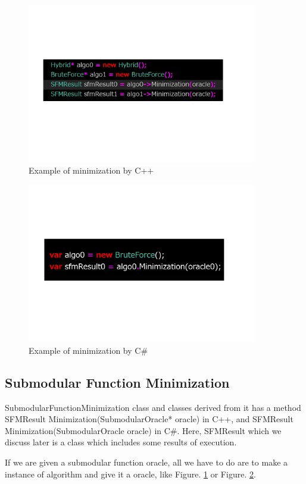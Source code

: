 \documentclass{article}
\begin{document}
\begin{figure}[h!]\label{C++MinPic}
{
\fontsize{10pt}{12pt}\selectfont
\centering
\includegraphics[height=7.0cm]{picture/C++Min.png}
\caption{Example of minimization by C++}
}
\end{figure}

\begin{figure}[h!]\label{CSMinPic}
{
\fontsize{10pt}{12pt}\selectfont
\centering
\includegraphics[height=7.0cm]{picture/CSMin.png}
\caption{Example of minimization by C\#}
}
\end{figure}

\newpage

\subsection{Submodular Function Minimization}
SubmodularFunctionMinimization class and classes derived from it has a method SFMResult Minimization(SubmodularOracle* oracle) in C++,
and SFMResult Minimization(SubmodularOracle oracle) in C\#.
Here, SFMResult which we discuss later is a class which includes some results of execution.

If we are given a submodular function oracle,
all we have to do are to make a instance of algorithm and give it a oracle,
like Figure. \ref{C++MinPic} or Figure. \ref{CSMinPic}.
\end{document}
